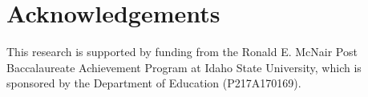 \documentclass[conference]{IEEEtran}
\begin{document}
\hypertarget{acknowledgements-1}{%
\section*{Acknowledgements}\label{acknowledgements-1}}

This research is supported by funding from the Ronald E. McNair Post
Baccalaureate Achievement Program at Idaho State University, which is
sponsored by the Department of Education (P217A170169).

\setlength{\parsep}{0pt}



\end{document}
